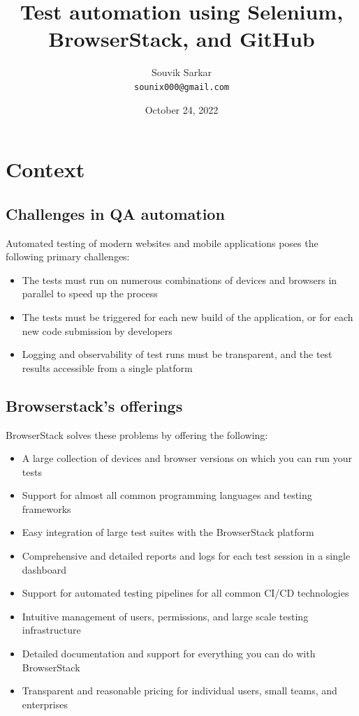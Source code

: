 \documentclass{article}
\title{Test automation using Selenium, BrowserStack, and GitHub}
\author{Souvik Sarkar \\ \texttt{sounix000@gmail.com}} %
\date{October 24, 2022}
\begin{document}
\maketitle

\section*{Context}

\subsection*{Challenges in QA automation}

Automated testing of modern websites and mobile applications poses the following primary challenges:

\begin{itemize}
    \item The tests must run on numerous combinations of devices and browsers in parallel to speed up the process
    \item The tests must be triggered for each new build of the application, or for each new code submission by developers
    \item Logging and observability of test runs must be transparent, and the test results accessible from a single platform
\end{itemize}

\subsection*{Browserstack's offerings}

BrowserStack solves these problems by offering the following:

\begin{itemize}
    \item A large collection of devices and browser versions on which you can run your tests
    \item Support for almost all common programming languages and testing frameworks
    \item Easy integration of large test suites with the BrowserStack platform
    \item Comprehensive and detailed reports and logs for each test session in a single dashboard
    \item Support for automated testing pipelines for all common CI/CD technologies
    \item Intuitive management of users, permissions, and large scale testing infrastructure
    \item Detailed documentation and support for everything you can do with BrowserStack
    \item Transparent and reasonable pricing for individual users, small teams, and enterprises
\end{itemize}
\end{document}
